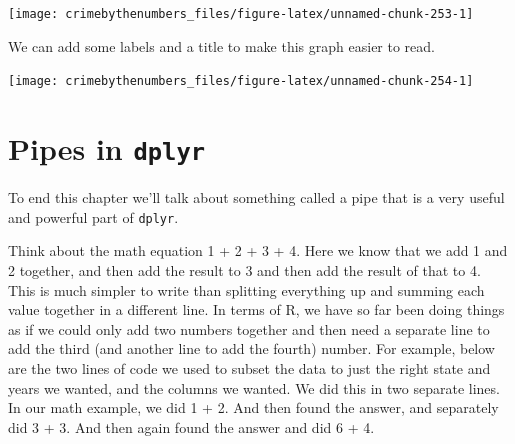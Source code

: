 \documentclass[
]{krantz}
\makeatletter
\newenvironment{Shaded}{\begin{snugshade}}{\end{snugshade}}
\newcommand{\AttributeTok}[1]{\textcolor[rgb]{0.61,0.61,0.61}{#1}}
\newcommand{\FunctionTok}[1]{\textcolor[rgb]{0,0,0}{#1}}
\newcommand{\NormalTok}[1]{#1}
\newcommand{\SpecialCharTok}[1]{\textcolor[rgb]{0,0,0}{#1}}
\newcommand{\StringTok}[1]{\textcolor[rgb]{0.5,0.5,0.5}{#1}}
\newenvironment{kframe}{%
\medskip{}
\setlength{\fboxsep}{.8em}
 \def\at@end@of@kframe{}%
 \ifinner\ifhmode%
  \def\at@end@of@kframe{\end{minipage}}%
  \begin{minipage}{\columnwidth}%
 \fi\fi%
 \def\FrameCommand##1{\hskip\@totalleftmargin \hskip-\fboxsep
 \colorbox{shadecolor}{##1}\hskip-\fboxsep
     \hskip-\linewidth \hskip-\@totalleftmargin \hskip\columnwidth}%
 \MakeFramed {\advance\hsize-\width
   \@totalleftmargin\z@ \linewidth\hsize
   \@setminipage}}%
 {\par\unskip\endMakeFramed%
 \at@end@of@kframe}
\renewenvironment{Shaded}{\begin{kframe}}{\end{kframe}}
\makeatother
\begin{document}
\begin{Shaded}
\end{Shaded}

\begin{center}\texttt{[image: crimebythenumbers\_files/figure-latex/unnamed-chunk-253-1]} \end{center}

We can add some labels and a title to make this graph easier
to read.

\begin{Shaded}
\end{Shaded}

\begin{center}\texttt{[image: crimebythenumbers\_files/figure-latex/unnamed-chunk-254-1]} \end{center}

\hypertarget{dplyr-pipes}{%
\section{\texorpdfstring{Pipes in
\texttt{dplyr}}{Pipes in dplyr}}\label{dplyr-pipes}}

To end this chapter we'll talk about something called a pipe
that is a very useful and powerful part of \texttt{dplyr}.

Think about the math equation 1 + 2 + 3 + 4. Here we know
that we add 1 and 2 together, and then add the result to 3
and then add the result of that to 4. This is much simpler
to write than splitting everything up and summing each value
together in a different line. In terms of R, we have so far
been doing things as if we could only add two numbers
together and then need a separate line to add the third (and
another line to add the fourth) number. For example, below
are the two lines of code we used to subset the data to just
the right state and years we wanted, and the columns we
wanted. We did this in two separate lines. In our math
example, we did 1 + 2. And then found the answer, and
separately did 3 + 3. And then again found the answer and
did 6 + 4.
\end{document}
